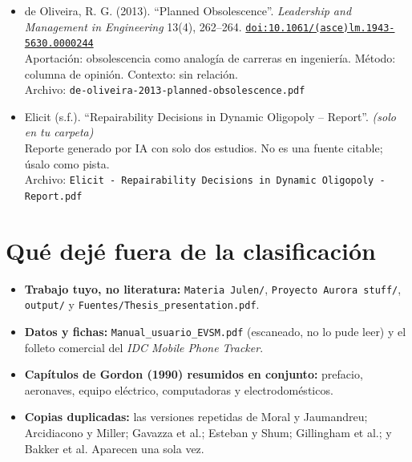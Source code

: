 \documentclass[11pt]{article}
\begin{document}
\begin{itemize}
Aportación: obsolescencia organizacional y capacidades dinámicas en una pyme. Método: estudio de caso cualitativo. Contexto: no trata de la obsolescencia de producto.\\
{\footnotesize Archivo: \texttt{Making\_obsolescence\_obsolete.pdf}}
\item de Oliveira, R. G. (2013). ``Planned Obsolescence''. \textit{Leadership and Management in Engineering} 13(4), 262--264. \href{https://doi.org/10.1061/(asce)lm.1943-5630.0000244}{\texttt{doi:10.1061/(asce)lm.1943-5630.0000244}}\\
Aportación: obsolescencia como analogía de carreras en ingeniería. Método: columna de opinión. Contexto: sin relación.\\
{\footnotesize Archivo: \texttt{de-oliveira-2013-planned-obsolescence.pdf}}
\item Elicit (s.f.). ``Repairability Decisions in Dynamic Oligopoly -- Report''. \textit{(solo en tu carpeta)}\\
Reporte generado por IA con solo dos estudios. No es una fuente citable; úsalo como pista.\\
{\footnotesize Archivo: \texttt{Elicit - Repairability Decisions in Dynamic Oligopoly - Report.pdf}}
\end{itemize}

\appendix
\section{Qué dejé fuera de la clasificación}
\begin{itemize}
\item \textbf{Trabajo tuyo, no literatura:} \texttt{Materia Julen/}, \texttt{Proyecto Aurora stuff/}, \texttt{output/} y \texttt{Fuentes/Thesis\_presentation.pdf}.
\item \textbf{Datos y fichas:} \texttt{Manual\_usuario\_EVSM.pdf} (escaneado, no lo pude leer) y el folleto comercial del \textit{IDC Mobile Phone Tracker}.
\item \textbf{Capítulos de Gordon (1990) resumidos en conjunto:} prefacio, aeronaves, equipo eléctrico, computadoras y electrodomésticos.
\item \textbf{Copias duplicadas:} las versiones repetidas de Moral y Jaumandreu; Arcidiacono y Miller; Gavazza et al.; Esteban y Shum; Gillingham et al.; y Bakker et al. Aparecen una sola vez.
\end{itemize}
\end{document}
